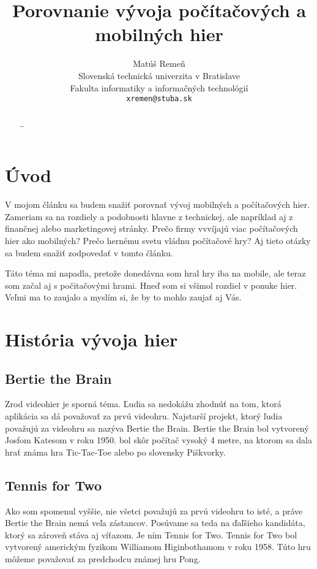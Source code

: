 \documentclass[10pt,twoside,slovak,a4paper]{article}
\title{Porovnanie vývoja počítačových a mobilných hier}
\author{Matúš Remeň\\[2pt]
	{\small Slovenská technická univerzita v Bratislave}\\
	{\small Fakulta informatiky a informačných technológií}\\
	{\small \texttt{xremen@stuba.sk}}
	}
\date{\small              }
\begin{document}
\maketitle

\begin{abstract}
\ldots
\end{abstract}



\section{Úvod}

V mojom článku sa budem snažiť porovnať vývoj mobilných a počítačových hier. Zameriam sa na rozdiely a podobnosti hlavne z technickej, ale napríklad aj z finančnej alebo marketingovej stránky. Prečo firmy vvvíjajú viac počítačových hier ako mobilných? Prečo hernému svetu vládnu počítačové hry? Aj tieto otázky sa budem snažiť zodpovedať v tomto článku.

Táto téma mi napadla, pretože donedávna som hral hry iba na mobile, ale teraz som začal aj s počitačovými hrami. Hneď som si všimol rozdiel v ponuke hier. Veľmi ma to zaujalo  a myslím si, že by to mohlo zaujať aj Vás.

\section{História vývoja hier} \label{historia} 

\subsection{Bertie the Brain} \label{historia:bertie}
Zrod videohier je sporná téma. Ľudia sa nedokážu zhodnúť na tom, ktorá aplikácia sa dá považovať za prvú videohru. Najstarší projekt, ktorý ľudia považujú za videohru sa nazýva Bertie the Brain. Bertie the Brain bol vytvorený Josfom Katesom v roku 1950. bol skôr počítač vysoký 4 metre, na ktorom sa dala hrať známa hra Tic-Tac-Toe alebo po slovensky Piškvorky.

\subsection{Tennis for Two} \label{historia:tennis}
Ako som spomenul vyššie, nie všetci považujú za prvú videohru to isté, a práve Bertie the Brain nemá veľa zástancov. Posúvame sa teda na ďaľšieho kandidáta, ktorý sa zároveň stáva aj víťazom. Je ním Tennis for Two. Tennis for Two bol vytvorený americkým fyzikom Williamom Higinbothamom v roku 1958. Túto hru môžeme považovať za predchodcu známej hru Pong.
\end{document}
